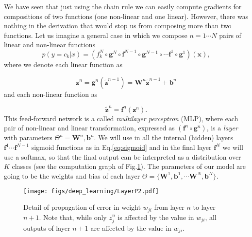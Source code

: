 We have seen that just using the chain rule we can easily compute gradients for
compositions of two functions (one non-linear and one linear). However, there
was nothing in the derivation that would stop us from composing more than two
functions. 
Let us imagine a general case in which we compose $n=1 \cdots N$
pairs of linear and non-linear functions 
%
\begin{equation}
p(y=c_k|{x}) = (f_k^N \circ \mathbf{g}^N \circ \mathbf{f}^{N-1} \circ \mathbf{g}^{N-1} \circ \cdots \mathbf{f}^1 \circ \mathbf{g}^1)(\mathbf{x}),
\label{eq:FeedForward}
\end{equation}
%
\noindent where we denote each linear function as

\begin{equation}
\mathbf{z}^n = \mathbf{g}^n(\tilde{\mathbf{z}}^{n-1}) = \mathbf{W}^n \tilde{\mathbf{z}}^{n-1} + \mathbf{b}^n 
\end{equation}
%
\noindent and each non-linear function as 

\begin{equation}
\tilde{\mathbf{z}}^n = \mathbf{f}^n(\mathbf{z}^n).
\end{equation}
%
This feed-forward network is a called \textit{multilayer perceptron} (MLP), where each pair of non-linear and linear transformation, expressed as $(\mathbf{f}^n \circ \mathbf{g}^n)$, is a \textit{layer} with parameters $\Theta^n={\mathbf{W}^n, \mathbf{b}^n}$. We will use in all the internal (hidden) layers $\mathbf{f}^1 \cdots \mathbf{f}^{N-1}$ sigmoid functions as in Eq.\ref{eq:sigmoid} and in the final layer $\mathbf{f}^N$ we will use a softmax, so that the final output
can be interpreted as a distribution over $K$ classes (see the computation graph of Fig.\ref{fig:LayerP2}). The parameters of our
model are going to be the weights and bias of each layer
$\Theta=\{\mathbf{W}^1, \mathbf{b}^1, \cdots \mathbf{W}^N, \mathbf{b}^N\}$.

\begin{figure}
\centering
\texttt{[image: figs/deep\_learning/LayerP2.pdf]}
\caption{Detail of propagation of error in weight $w_{ji}$ from layer $n$ to
layer $n+1$. Note that, while only $z_j^n$ is affected by the value in $w_{ji}$, all outputs
of layer $n+1$ are affected by the value in $w_{ji}$.
}
\label{fig:LayerP2}
\end{figure}

